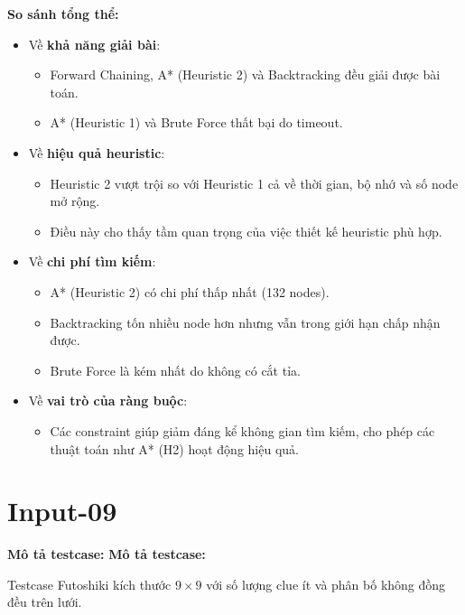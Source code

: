 \textbf{So sánh tổng thể:}

\begin{itemize}
    \item Về \textbf{khả năng giải bài}:
    \begin{itemize}
        \item Forward Chaining, A* (Heuristic 2) và Backtracking đều giải được bài toán.
        \item A* (Heuristic 1) và Brute Force thất bại do timeout.
    \end{itemize}
    
    \item Về \textbf{hiệu quả heuristic}:
    \begin{itemize}
        \item Heuristic 2 vượt trội so với Heuristic 1 cả về thời gian, bộ nhớ và số node mở rộng.
        \item Điều này cho thấy tầm quan trọng của việc thiết kế heuristic phù hợp.
    \end{itemize}
    
    \item Về \textbf{chi phí tìm kiếm}:
    \begin{itemize}
        \item A* (Heuristic 2) có chi phí thấp nhất (132 nodes).
        \item Backtracking tốn nhiều node hơn nhưng vẫn trong giới hạn chấp nhận được.
        \item Brute Force là kém nhất do không có cắt tỉa.
    \end{itemize}
    
    \item Về \textbf{vai trò của ràng buộc}:
    \begin{itemize}
        \item Các constraint giúp giảm đáng kể không gian tìm kiếm, cho phép các thuật toán như A* (H2) hoạt động hiệu quả.
    \end{itemize}

\end{itemize}

\section{Input-09}
\textbf{Mô tả testcase:}
\textbf{Mô tả testcase:}

Testcase Futoshiki kích thước $9 \times 9$ với số lượng clue ít và phân bố không đồng đều trên lưới. 

